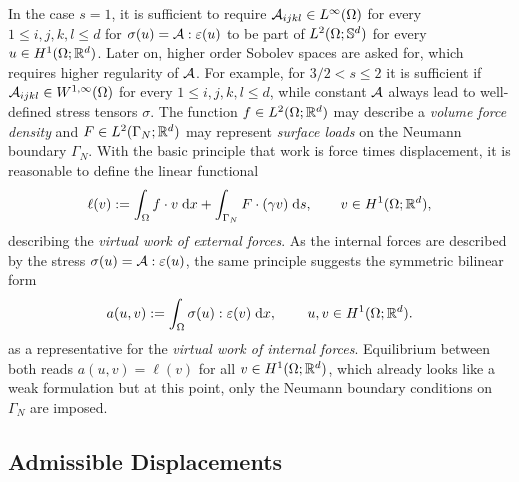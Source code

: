In the case $s = 1$, it is sufficient to require $\cA_{ijkl}\in L^\infty(\Omega)$ for every $1\le i,j,k,l\le d$ for $\sigma(u) = \cA:\varepsilon(u)$ to be part of $L^2(\Omega;\S^d)$ for every $u\in H^1(\Omega;\R^d)$. Later on, higher order Sobolev spaces are asked for, which requires higher regularity of $\cA$. For example, for $3/2<s\le 2$ it is sufficient if $\cA_{ijkl}\in W^{1,\infty}(\Omega)$ for every $1\le i,j,k,l\le d$, while constant $\cA$ always lead to well-defined stress tensors $\sigma$. The function $f\in L^2(\Omega;\R^d)$ may describe a {\em volume force density} and $F\in L^2(\Gamma_N;\R^d)$ may represent {\em surface loads} on the Neumann boundary $\Gamma_N$. With the basic principle that work is force times displacement, it is reasonable to define the linear functional
\begin{equation}\label{eq:loadfunc}
	\ell(v):= \int_\Omega f\cdot v\;\dx +\int_{\Gamma_N} F\cdot(\gamma v)\;\ds ,\qquad v\in H^1(\Omega;\R^d),
\end{equation}
describing the {\em virtual work of external forces}. As the internal forces are described by the stress $\sigma(u)= \cA:\varepsilon(u)$, the same principle suggests the symmetric bilinear form
\begin{equation}\label{eq:symbil}
	a(u,v):= \int_\Omega \sigma(u):\varepsilon(v)\;\dx,\,\qquad u,v\in H^1(\Omega;\R^d).
\end{equation}
as a representative for the {\em virtual work of internal forces}. Equilibrium between both reads $a(u,v) = \ell(v)$ for all $v\in H^1(\Omega;\R^d)$, which already looks like a weak formulation but at this point, only the Neumann boundary conditions on $\Gamma_N$ are imposed.

\subsection{Admissible Displacements}

